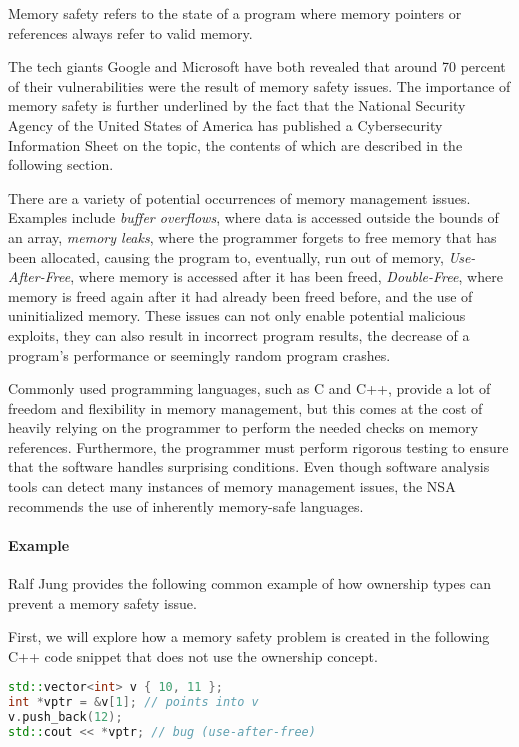 \documentclass[sigplan,11pt,nonacm]{acmart}
\begin{document}
Memory safety refers to the state of a program where memory pointers or references always refer to valid memory.

The tech giants Google \cite{google-memory-safety} and Microsoft \cite{microsoft-memory-safety} have both revealed that around 70 percent of their vulnerabilities were the result of memory safety issues.
The importance of memory safety is further underlined by the fact that the National Security Agency of the United States of America has published a Cybersecurity Information Sheet \cite{nsa-memory-safety} on the topic, the contents of which are described in the following section.

There are a variety of potential occurrences of memory management issues.
Examples include \emph{buffer overflows}, where data is accessed outside the bounds of an array, \emph{memory leaks}, where the programmer forgets to free memory that has been allocated, causing the program to, eventually, run out of memory, \emph{Use-After-Free}, where memory is accessed after it has been freed, \emph{Double-Free}, where memory is freed again after it had already been freed before, and the use of uninitialized memory.
These issues can not only enable potential malicious exploits, they can also result in incorrect program results, the decrease of a program's performance or seemingly random program crashes.

Commonly used programming languages, such as C and C++, provide a lot of freedom and flexibility in memory management, but this comes at the cost of heavily relying on the programmer to perform the needed checks on memory references.
Furthermore, the programmer must perform rigorous testing to ensure that the software handles surprising conditions.
Even though software analysis tools can detect many instances of memory management issues, the NSA recommends the use of inherently memory-safe languages.


\paragraph{Example}

Ralf Jung \cite{understanding-evolving-rust} provides the following common example of how ownership types can prevent a memory safety issue.

First, we will explore how a memory safety problem is created in the following C++ code snippet that does not use the ownership concept.

\begin{lstlisting}[language=C++]
std::vector<int> v { 10, 11 };
int *vptr = &v[1]; // points into v
v.push_back(12);
std::cout << *vptr; // bug (use-after-free)
\end{lstlisting}
\end{document}
